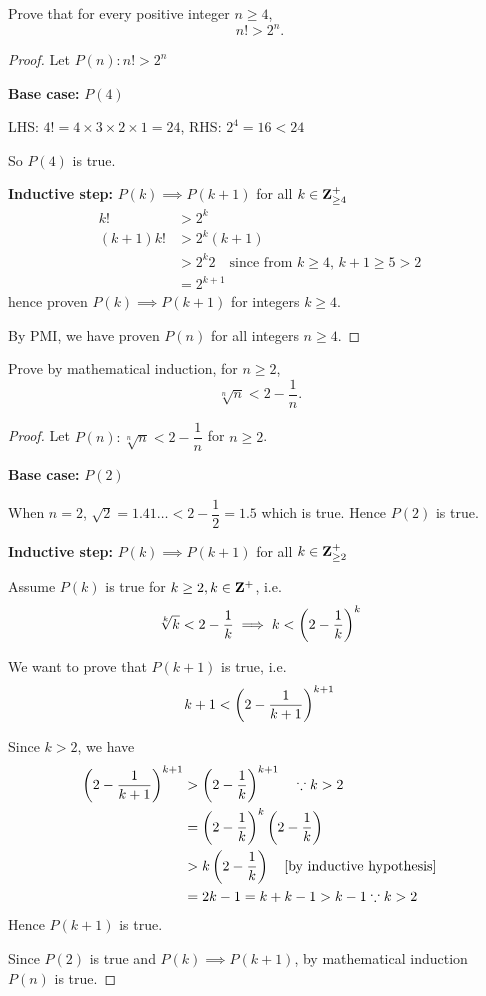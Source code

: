 \begin{prbm}
Prove that for every positive integer $n\ge4$,
\[ n!>2^n. \]
\end{prbm}

\begin{proof}
Let $P(n):n!>2^n$

\textbf{Base case:} $P(4)$

LHS: $4!=4\times3\times2\times1=24$, RHS: $2^4=16<24$

So $P(4)$ is true.

\textbf{Inductive step:} $P(k) \implies P(k+1)$ for all $k\in\mathbf Z^+_{\ge4}$
\begin{align*}
k! &> 2^k \\
(k+1)k! &> 2^k(k+1) \\
&> 2^k2 \quad \text{since from $k\ge4$, $k+1\ge5>2$} \\
&= 2^{k+1}
\end{align*}
hence proven $P(k) \implies P(k+1)$ for integers $k\ge4$.

By PMI, we have proven $P(n)$ for all integers $n\ge4$.
\end{proof}

\begin{prbm}
Prove by mathematical induction, for $n\ge2$,
\[ \sqrt[n]{n}<2-\frac{1}{n}. \]
\end{prbm}

\begin{proof}
Let $P(n):\sqrt[n]{n}<2 - \dfrac{1}{n}$ for $n \ge 2$.

\textbf{Base case:} $P(2)$

When $n=2$, $\sqrt{2}=1.41\dots<2-\dfrac{1}{2}=1.5$ which is true. Hence $P(2)$ is true.

\textbf{Inductive step:} $P(k)\implies P(k+1)$ for all $k\in\mathbf Z^+_{\ge2}$

Assume $P(k)$ is true for $k \ge 2, k \in \mathbf Z^+$, i.e.
\[ \sqrt[k]{k}<2 - \dfrac{1}{k} \implies k<\left(2-\frac{1}{k}\right)^k \]

We want to prove that $P(k+1)$ is true, i.e.
\[ k+1<\left(2-\frac{1}{k+1}\right)^{k+1} \]

Since $k>2$, we have 
\begin{align*}
\left(2-\frac{1}{k+1}\right)^{k+1}
&> \left(2-\frac{1}{k}\right)^{k+1} \quad \because k>2 \\
&= \left(2-\frac{1}{k}\right)^k\left(2-\frac{1}{k}\right) \\
&> k\left(2-\frac{1}{k}\right) \quad \text{[by inductive hypothesis]} \\
&= 2k-1=k+k-1 > k-1 \because k>2
\end{align*}
Hence $P(k+1)$ is true.

Since $P(2)$ is true and $P(k)\implies P(k+1)$, by mathematical induction $P(n)$ is true.
\end{proof}

